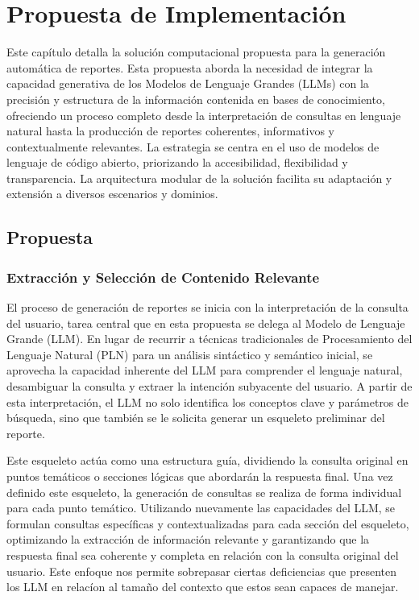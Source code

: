 \chapter{Propuesta de Implementación}\label{chapter:proposal}

Este capítulo detalla la solución computacional propuesta para la generación automática de reportes. Esta propuesta aborda la necesidad de integrar la capacidad generativa de los Modelos de Lenguaje Grandes (LLMs) con la precisión y estructura de la información contenida en bases de conocimiento, ofreciendo un proceso completo desde la interpretación de consultas en lenguaje natural hasta la producción de reportes coherentes, informativos y contextualmente relevantes. La estrategia se centra en el uso de modelos de lenguaje de código abierto, priorizando la accesibilidad, flexibilidad y transparencia. La arquitectura modular de la solución facilita su adaptación y extensión a diversos escenarios y dominios.

\section{Propuesta}

\subsection{Extracción y Selección de Contenido Relevante}

El proceso de generación de reportes se inicia con la interpretación de la consulta del usuario, tarea central que en esta propuesta se delega al Modelo de Lenguaje Grande (LLM). En lugar de recurrir a técnicas tradicionales de Procesamiento del Lenguaje Natural (PLN) para un análisis sintáctico y semántico inicial, se aprovecha la capacidad inherente del LLM para comprender el lenguaje natural, desambiguar la consulta y extraer la intención subyacente del usuario. A partir de esta interpretación, el LLM no solo identifica los conceptos clave y parámetros de búsqueda, sino que también se le solicita generar un esqueleto preliminar del reporte.

Este esqueleto actúa como una estructura guía, dividiendo la consulta original en puntos temáticos o secciones lógicas que abordarán la respuesta final. Una vez definido este esqueleto, la generación de consultas se realiza de forma individual para cada punto temático. Utilizando nuevamente las capacidades del LLM, se formulan consultas específicas y contextualizadas para cada sección del esqueleto, optimizando la extracción de información relevante y garantizando que la respuesta final sea coherente y completa en relación con la consulta original del usuario. Este enfoque nos permite sobrepasar ciertas deficiencias que presenten los LLM en relacíon al tamaño del contexto que estos sean capaces de manejar.

